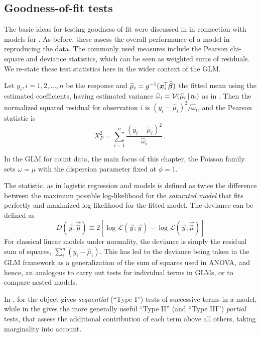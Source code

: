 \documentclass[11pt]{book}\usepackage[]{graphicx}\usepackage[]{color}
\begin{document}
\subsection{Goodness-of-fit tests}\label{sec:glm-goodfit}
The basic ideas for testing goodness-of-fit were discussed in 
in connection with \loglin models for \ctabs.
As before, these assess the overall performance of a model in reproducing the data.
The commonly used measures include the Pearson chi-square and
\LR deviance statistics, which can be seen as weighted sums of residuals.
We re-state these test statistics here in the wider context of the GLM.

Let $y_i, i=1, 2, \dots, n$ be the response and $\widehat{\mu}_i = g^{-1} (\bm{x}_i^\mathsf{T} \widehat{\bm{\beta}})$
the fitted mean using the estimated coefficients, having estimated variance
$\widehat{\omega}_i = \mathcal{V}(\widehat{\mu}_i\, | \, \eta_i)$ as in .
Then the normalized squared residual for observation $i$ is
$(y_i - \widehat{\mu}_i)^2 / \widehat{\omega}_i$, and the Pearson statistic is
\begin{equation}\label{eq:pearson}
X^2_P = \sum_{i=1}^n \frac{(y_i - \widehat{\mu}_i)^2}{\widehat{\omega}_i} \period
\end{equation}

In the GLM for count data, the main focus of this chapter, the Poisson family
sets $\omega = \mu$ with the dispersion parameter fixed at $\phi=1$.

The  statistic, as in logistic regression and \loglin models
is defined as twice the difference between the maximum possible log-likelihood
for the \emph{saturated model} that fits perfectly and maximized log-likelihood
for the fitted model. The deviance can be defined as
\begin{equation*}
D (\vec{y}, \vec{\widehat{\mu}}) \equiv 2 [ \log \mathcal{L}(\vec{y};\vec{y}) - \log \mathcal{L}(\vec{y};\vec{\widehat{\mu}})]
\end{equation*}
For classical linear models under normality, the deviance is simply the residual sum of squares,
$\sum_i^n (y_i - \widehat{\mu}_i)$.  This has led to the deviance being taken in the GLM
framework as a generalization of the sum of squares used in ANOVA, and hence, an analogous
 to carry out tests for individual terms in GLMs, or to compare
nested models.  

In \R,  for the  object 
gives \emph{sequential} (``Type I'') tests of successive terms in a model, while
 in the  gives the more generally useful 
``Type II'' (and ``Type III'') \emph{partial} tests, that assess the additional
contribution of each term above all others, taking marginality into account.
\end{document}
